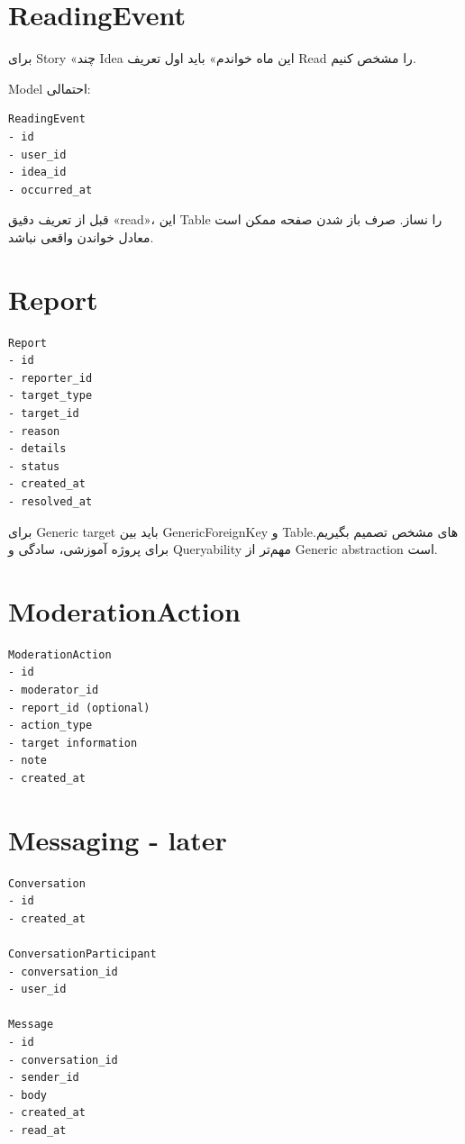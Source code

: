 \section{ReadingEvent}

برای Story «چند Idea این ماه خواندم» باید اول تعریف Read را مشخص کنیم.

Model احتمالی:
\begin{latin}
\begin{lstlisting}
ReadingEvent
- id
- user_id
- idea_id
- occurred_at
\end{lstlisting}
\end{latin}

\begin{warningbox}
قبل از تعریف دقیق «read»، این Table را نساز. صرف باز شدن صفحه ممکن است معادل خواندن واقعی نباشد.
\end{warningbox}

\section{Report}

\begin{latin}
\begin{lstlisting}
Report
- id
- reporter_id
- target_type
- target_id
- reason
- details
- status
- created_at
- resolved_at
\end{lstlisting}
\end{latin}

برای Generic target باید بین GenericForeignKey و Tableهای مشخص تصمیم بگیریم. برای پروژه آموزشی، سادگی و Queryability مهم‌تر از Generic abstraction است.

\section{ModerationAction}

\begin{latin}
\begin{lstlisting}
ModerationAction
- id
- moderator_id
- report_id (optional)
- action_type
- target information
- note
- created_at
\end{lstlisting}
\end{latin}

\section{Messaging - later}

\begin{latin}
\begin{lstlisting}
Conversation
- id
- created_at

ConversationParticipant
- conversation_id
- user_id

Message
- id
- conversation_id
- sender_id
- body
- created_at
- read_at
\end{lstlisting}
\end{latin}

